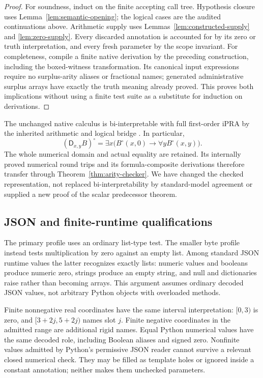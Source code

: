 \documentclass[11pt,letterpaper]{article}
\theoremstyle{definition}
\newcommand{\D}{\mathsf D}
\newcommand{\ipra}{\mathrm{iPRA}}
\begin{document}
\begin{proof}
For soundness, induct on the finite accepting call tree.  Hypothesis
closure uses Lemma~\ref{lem:semantic-opening}; the logical cases are
the audited continuations above.  Arithmetic supply uses
Lemmas~\ref{lem:constructed-supply} and \ref{lem:zero-supply}.
Every discarded annotation is accounted for by its zero or truth
interpretation, and every fresh parameter by the scope invariant.
For completeness, compile a finite native derivation by the preceding
construction, including the boxed-witness transformation.  Its
canonical input expressions require no surplus-arity aliases or fractional
names; generated administrative surplus arrays have exactly the truth
meaning already proved.  This proves both implications without using a finite test
suite as a substitute for induction on derivations.
\end{proof}

The unchanged native calculus is bi-interpretable with full first-order
$\ipra$ by the inherited arithmetic and logical bridge
\cite{generated,corpus}.  In particular,
\[
 (\D_{x,y}B)^\circ
 =\exists x\bigl(B^\circ(x,0)\to\forall yB^\circ(x,y)\bigr).
\]
The whole numerical domain and actual equality are retained.  Its
internally proved numerical round trips and its formula-composite
derivations therefore transfer through
Theorem~\ref{thm:arity-checker}.  We have changed the checked
representation, not replaced bi-interpretability by standard-model
agreement or supplied a new proof of the scalar predecessor theorem.

\subsection{JSON and finite-runtime qualifications}

The primary profile uses an ordinary list-type test.  The smaller byte
profile instead tests multiplication by zero against an empty list.
Among standard JSON runtime values the latter recognizes exactly lists:
numeric values and booleans produce numeric zero, strings produce an
empty string, and null and dictionaries raise rather than becoming
arrays.  This argument assumes ordinary decoded JSON values, not
arbitrary Python objects with overloaded methods.

Finite nonnegative real coordinates have the same interval
interpretation: $[0,3)$ is zero, and $[3+2j,5+2j)$ names slot $j$.
Finite negative coordinates in the admitted range are additional rigid
names.  Equal Python numerical values have the same decoded role,
including Boolean aliases and signed zero.  Nonfinite values admitted
by Python's permissive JSON reader cannot survive a relevant closed
numerical check.  They may be filled as template holes or ignored
inside a constant annotation; neither makes them unchecked parameters.
\end{document}
